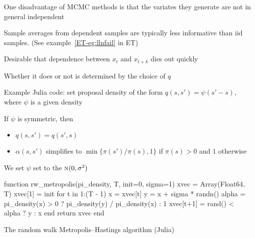 \begin{frame}

    \vspace{2em}
   One disadvantage of MCMC methods is that the variates they generate are not in general independent
    
    \vspace{1em}
    Sample averages from dependent samples are typically
    less informative than {\sc iid} samples.  (See example~\ref{ET-eg:llnfail} in ET)
    
    \vspace{1em}
    Desirable that dependence between $x_t$ and
    $x_{t+k}$ dies out quickly
    
    \vspace{1em}
    Whether it does or not is
    determined by the choice of $q$
    
\end{frame}

\begin{frame}

    \vspace{2em}
    Example Julia code: set proposal density of the form $q(s, s') = \psi(s' - s)$,
    where $\psi$ is a given
    density
    
    \vspace{1em}
    If $\psi$ is symmetric, then 
    \begin{itemize}
        \item $q(s, s') = q(s', s)$
        \item $\alpha(s, s')$ simplifies to $\min \{ \pi(s')/ \pi(s) , 1 \}$ if $\pi(s) > 0$
        and $1$ otherwise
    \end{itemize} 
    
    We set $\psi$ set to the $\textrm{\sc n}(0, \sigma^2)$
        
\end{frame}

\begin{frame}[fragile]

    \vspace{2em}
    \begin{listing}[H]
    \begin{juliacode}
function rw_metropolis(pi_density, T, init=0, sigma=1)
    xvec = Array(Float64, T)
    xvec[1] = init
    for t in 1:(T - 1)
        x = xvec[t]
        y = x + sigma * randn()
        alpha = pi_density(x) > 0 ? pi_density(y) 
            / pi_density(x) : 1 
        xvec[t+1] = rand() < alpha  ? y : x
    end
    return xvec
end

    \end{juliacode}
         \caption{The random walk Metropolis--Hastings algorithm (Julia)}
    \end{listing}
        
\end{frame}

